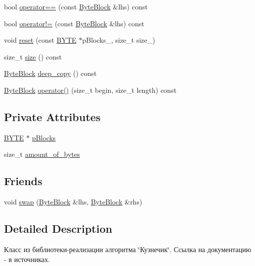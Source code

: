 \begin{DoxyCompactItemize}
\item 
bool \hyperlink{class_byte_block_a08193b9eb12da9889420f95bee6ce610}{operator==} (const \hyperlink{class_byte_block}{Byte\+Block} \&lhs) const
\item 
bool \hyperlink{class_byte_block_a083e6c9d3ec3e39d79953eb48551d0cf}{operator!=} (const \hyperlink{class_byte_block}{Byte\+Block} \&lhs) const
\item 
void \hyperlink{class_byte_block_aba0c3bafa18238bb269ec40962baa3c1}{reset} (const \hyperlink{mycrypto_8hpp_a4ae1dab0fb4b072a66584546209e7d58}{B\+Y\+TE} $\ast$p\+Blocks\+\_\+, size\+\_\+t size\+\_\+)
\item 
size\+\_\+t \hyperlink{class_byte_block_a160a348384c35cd7beae4e123b74bf18}{size} () const
\item 
\hyperlink{class_byte_block}{Byte\+Block} \hyperlink{class_byte_block_a67954bc5c1f34b2ab865bacb777c9f37}{deep\+\_\+copy} () const
\item 
\hyperlink{class_byte_block}{Byte\+Block} \hyperlink{class_byte_block_ad60eb576a039f436736d35e3a6d09131}{operator()} (size\+\_\+t begin, size\+\_\+t length) const
\end{DoxyCompactItemize}
\subsection*{Private Attributes}
\begin{DoxyCompactItemize}
\item 
\hyperlink{mycrypto_8hpp_a4ae1dab0fb4b072a66584546209e7d58}{B\+Y\+TE} $\ast$ \hyperlink{class_byte_block_a9cc668dbb2b3562e1b72b2265f3bc077}{p\+Blocks}
\item 
size\+\_\+t \hyperlink{class_byte_block_a96ef9896e7d4a252485bbac909c7cb76}{amount\+\_\+of\+\_\+bytes}
\end{DoxyCompactItemize}
\subsection*{Friends}
\begin{DoxyCompactItemize}
\item 
void \hyperlink{class_byte_block_aff71aa0d084ae3b604be05fa66e1d4cd}{swap} (\hyperlink{class_byte_block}{Byte\+Block} \&lhs, \hyperlink{class_byte_block}{Byte\+Block} \&rhs)
\end{DoxyCompactItemize}


\subsection{Detailed Description}
Класс из библиотеки-\/реализации алгоритма \char`\"{}Кузнечик\char`\"{}. Ссылка на документацию -\/ в источниках. 

